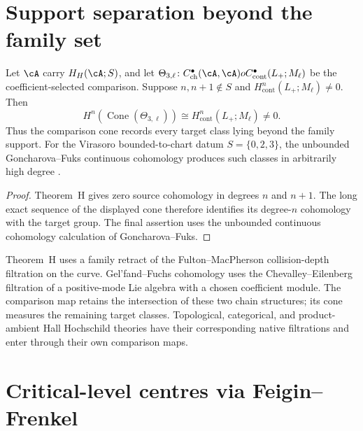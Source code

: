 \section{Support separation beyond the family set}
\label{sec:three-hochschild-divergence}

\begin{proposition}
\label{prop:three-hochschild-high-degree-divergence}
Let $\cA$ carry $H_H(\cA;S)$, and let
$\Theta_{3,\ell}\colon C^\bullet_{\mathrm{ch}}(\cA,\cA)	o
C^\bullet_{\mathrm{cont}}(L_+;M_\ell)$ be the coefficient-selected
comparison.  Suppose $n,n+1\notin S$ and
$H^n_{\mathrm{cont}}(L_+;M_\ell)\neq0$.  Then
\[
 H^n\!\left(\operatorname{Cone}(\Theta_{3,\ell})\right)
 \cong H^n_{\mathrm{cont}}(L_+;M_\ell)\neq0.
\]
Thus the comparison cone records every target class lying beyond the
family support.  For the Virasoro bounded-to-chart datum
$S=\{0,2,3\}$, the unbounded Goncharova--Fuks continuous cohomology
produces such classes in arbitrarily high degree
\cite{Goncharova73,Fuks86}.
\end{proposition}

\begin{proof}
Theorem~H gives zero source cohomology in degrees $n$ and $n+1$.
The long exact sequence of the displayed cone therefore identifies
its degree-$n$ cohomology with the target group.  The final assertion
uses the unbounded continuous cohomology calculation of
Goncharova--Fuks.
\end{proof}

\begin{remark}
\label{rem:why-theorem-H-not-GF}
Theorem~H uses a family retract of the Fulton--MacPherson
collision-depth filtration on the curve.  Gel'fand--Fuchs cohomology
uses the Chevalley--Eilenberg filtration of a positive-mode Lie
algebra with a chosen coefficient module.  The comparison map retains
the intersection of these two chain structures; its cone measures the
remaining target classes.  Topological, categorical, and
product-ambient Hall Hochschild theories have their corresponding
native filtrations and enter through their own comparison maps.
\end{remark}

\section{Critical-level centres via Feigin--Frenkel}
\label{sec:critical-level-ff}

